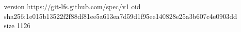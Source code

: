 version https://git-lfs.github.com/spec/v1
oid sha256:1e015b13522f2f88df81ee5a613ea7d59d1f95ee140828e25a3b607c4e0903dd
size 1126

